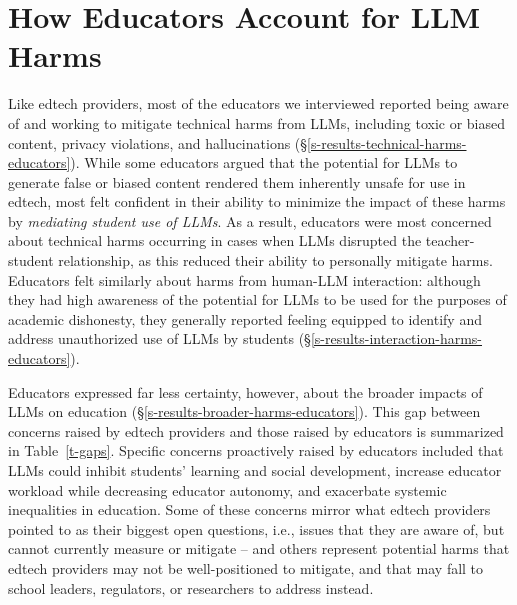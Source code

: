 \section{How Educators Account for LLM Harms}\label{s-results-educators}
Like edtech providers, most of the educators we interviewed reported being aware of and working to mitigate technical harms from LLMs, including toxic or biased content, privacy violations, and hallucinations (\S\ref{s-results-technical-harms-educators}). While some educators argued that the potential for LLMs to generate false or biased content rendered them inherently unsafe for use in edtech, most felt confident in their ability to minimize the impact of these harms by \textit{mediating student use of LLMs}. As a result, educators were most concerned about technical harms occurring in cases when LLMs disrupted the teacher-student relationship, as this reduced their ability to personally mitigate harms. Educators felt similarly about harms from human-LLM interaction: although they had high awareness of the potential for LLMs to be used for the purposes of academic dishonesty, they generally reported feeling equipped to identify and address unauthorized use of LLMs by students (\S\ref{s-results-interaction-harms-educators}).

Educators expressed far less certainty, however, about the broader impacts of LLMs on education (\S\ref{s-results-broader-harms-educators}). This gap between concerns raised by edtech providers and those raised by educators is summarized in Table~\ref{t-gaps}. Specific concerns proactively raised by educators included that LLMs could inhibit students' learning and social development, increase educator workload while decreasing educator autonomy, and exacerbate systemic inequalities in education. Some of these concerns mirror what edtech providers pointed to as their biggest open questions, i.e., issues that they are aware of, but cannot currently measure or mitigate -- and others represent potential harms that edtech providers may not be well-positioned to mitigate, and that may fall to school leaders, regulators, or researchers to address instead.

